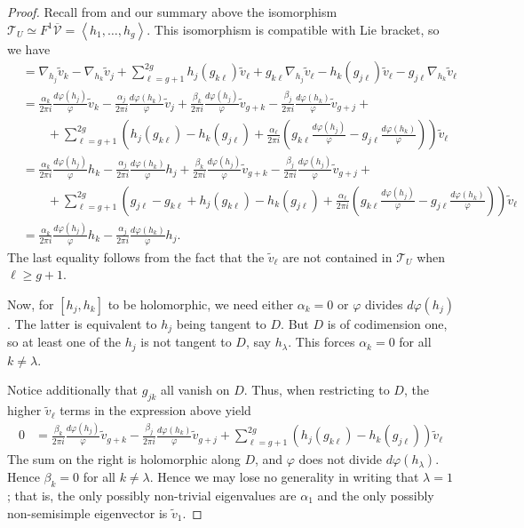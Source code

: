 \documentclass[12pt]{amsart}
\newcommand{\cT}{\mathcal{T}}
\newcommand{\cV}{\mathcal{V}}
\newcommand{\ol}{\overline}
\newcommand{\wt}{\widetilde}
\theoremstyle{definition}
\numberwithin{equation}{section}
\begin{document}
\begin{proof}
Recall from \cite{bakker-schnell23} and our summary above the isomorphism 
\(\cT_U \simeq F^1 \ol{\cV} = \left<h_1,\dots, h_g\right>\).
This isomorphism is compatible with Lie bracket, so we have 
\begin{align*}
    [h_j, h_k] &= \nabla_{h_j} \wt{v}_k - \nabla_{h_k} \wt{v}_j 
    +  \sum_{\ell = g+1}^{2g} h_j(g_{k\ell})\wt{v}_\ell + g_{k \ell} \nabla_{h_j} \wt{v}_\ell   
    - h_k(g_{j\ell})\wt{v}_\ell - g_{j \ell} \nabla_{h_k} \wt{v}_\ell\\
    &= \frac{\alpha_k}{2\pi i} \frac{d\varphi(h_j)}{\varphi} \wt{v}_k - 
    \frac{\alpha_j}{2\pi i} \frac{d\varphi(h_k)}{\varphi} \wt{v}_j + 
    \frac{\beta_k}{2\pi i} \frac{d\varphi(h_j)}{\varphi} \wt{v}_{g+k} - 
    \frac{\beta_j}{2\pi i} \frac{d\varphi(h_k)}{\varphi} \wt{v}_{g+j} + \\
    &\qquad + \sum_{\ell = g+1}^{2g} \left( h_j(g_{k\ell}) - h_k(g_{j\ell}) + 
    \frac{\alpha_\ell}{2\pi i} \left(g_{k\ell}\frac{d\varphi(h_j)}{\varphi} - g_{j\ell}\frac{d\varphi(h_k)}{\varphi}\right) \right) \wt{v}_\ell \\
    &= \frac{\alpha_k}{2\pi i} \frac{d\varphi(h_j)}{\varphi} h_k - \frac{\alpha_j}{2\pi i} \frac{d\varphi(h_k)}{\varphi} h_j 
    + \frac{\beta_k}{2\pi i} \frac{d\varphi(h_j)}{\varphi} \wt{v}_{g+k} - 
    \frac{\beta_j}{2\pi i} \frac{d\varphi(h_j)}{\varphi} \wt{v}_{g+j} + \\
    &\qquad + \sum_{\ell = g+1}^{2g} \left( g_{j\ell} - g_{k\ell} + 
    h_j(g_{k\ell}) - h_k(g_{j\ell}) + \frac{\alpha_\ell}{2\pi i} 
    \left(g_{k\ell}\frac{d\varphi(h_j)}{\varphi} - g_{j\ell}\frac{d\varphi(h_k)}{\varphi}\right) \right) \wt{v}_\ell \\
    &= \frac{\alpha_k}{2\pi i} \frac{d\varphi(h_j)}{\varphi} h_k -
    \frac{\alpha_j}{2\pi i} \frac{d\varphi(h_k)}{\varphi} h_j.
\end{align*}
The last equality follows from the fact that the \(\wt{v}_\ell\) are not contained in 
\(\cT_U\) when \(\ell \geq g+1\).

Now, for \([h_j, h_k]\) to be holomorphic, we need either \(\alpha_k = 0\) or 
\(\varphi\) divides \(d\varphi(h_j)\). The latter is equivalent to \(h_j\) being tangent to \(D\).
But \(D\) is of codimension one, so at least one of the \(h_j\) is not tangent 
to \(D\), say \(h_\lambda\). This forces \(\alpha_k = 0\) for all \(k \neq \lambda\).

Notice additionally that \(g_{jk}\) all vanish on \(D\). Thus, when restricting 
to \(D\), the higher \(\wt{v}_\ell\) terms in the expression above yield 
\begin{align*}
    0 &= \frac{\beta_k}{2\pi i} \frac{d\varphi(h_j)}{\varphi} \wt{v}_{g+k} - 
    \frac{\beta_j}{2\pi i} \frac{d\varphi(h_k)}{\varphi} \wt{v}_{g+j} +
    \sum_{\ell = g+1}^{2g} \left(h_j(g_{k\ell}) - h_k(g_{j\ell}) \right) \wt{v}_\ell
\end{align*}
The sum on the right is holomorphic along \(D\), and \(\varphi\) does not divide
\(d\varphi(h_\lambda)\). Hence \(\beta_k = 0\) for all \(k \neq \lambda\). Hence we may 
lose no generality in writing that \(\lambda=1\); that is, the only possibly non-trivial
eigenvalues are \(\alpha_1\) and the only possibly non-semisimple eigenvector is 
\(\wt{v}_1\).


\end{proof}
\end{document}
